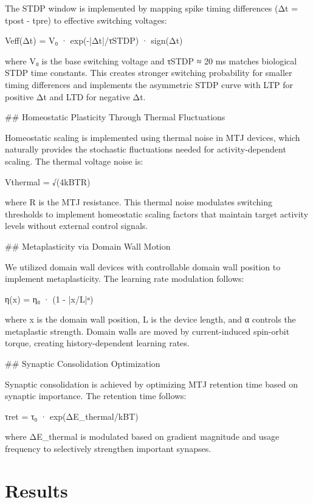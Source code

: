 \documentclass[two_column,11pt]{article}
\begin{document}
        The STDP window is implemented by mapping spike timing differences (Δt = tpost - tpre) to effective switching voltages:
        
        Veff(Δt) = V₀ · exp(-|Δt|/τSTDP) · sign(Δt)
        
        where V₀ is the base switching voltage and τSTDP ≈ 20 ms matches biological STDP time constants. This creates stronger switching probability for smaller timing differences and implements the asymmetric STDP curve with LTP for positive Δt and LTD for negative Δt.
        
        ## Homeostatic Plasticity Through Thermal Fluctuations
        
        Homeostatic scaling is implemented using thermal noise in MTJ devices, which naturally provides the stochastic fluctuations needed for activity-dependent scaling. The thermal voltage noise is:
        
        Vthermal = √(4kBTR)
        
        where R is the MTJ resistance. This thermal noise modulates switching thresholds to implement homeostatic scaling factors that maintain target activity levels without external control signals.
        
        ## Metaplasticity via Domain Wall Motion
        
        We utilized domain wall devices with controllable domain wall position to implement metaplasticity. The learning rate modulation follows:
        
        η(x) = η₀ · (1 - |x/L|ᵅ)
        
        where x is the domain wall position, L is the device length, and α controls the metaplastic strength. Domain walls are moved by current-induced spin-orbit torque, creating history-dependent learning rates.
        
        ## Synaptic Consolidation Optimization
        
        Synaptic consolidation is achieved by optimizing MTJ retention time based on synaptic importance. The retention time follows:
        
        τret = τ₀ · exp(ΔE_thermal/kBT)
        
        where ΔE_thermal is modulated based on gradient magnitude and usage frequency to selectively strengthen important synapses.
        

\section{Results}
\end{document}
